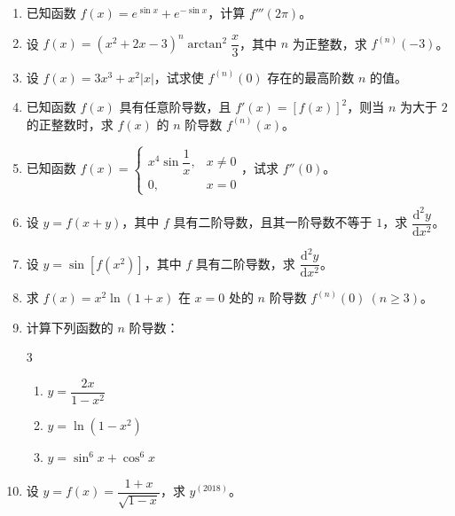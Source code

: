 \begin{enumerate}[label=\textbf{\arabic*.}, itemsep=5.2cm]
    \item 已知函数 $f(x) = e^{\sin x} + e^{-\sin x}$，计算 $f'''(2\pi)$。

    \item 设 $f(x) = (x^2 + 2x - 3)^n \arctan^2 \dfrac{x}{3}$，其中 $n$ 为正整数，求 $f^{(n)}(-3)$。

    \item 设 $f(x) = 3x^3 + x^2 |x|$，试求使 $f^{(n)}(0)$ 存在的最高阶数 $n$ 的值。

    \item 已知函数 $f(x)$ 具有任意阶导数，且 $f'(x) = [f(x)]^2$，则当 $n$ 为大于 $2$ 的正整数时，求 $f(x)$ 的 $n$ 阶导数 $f^{(n)}(x)$。

    \item 已知函数 $f(x) = \begin{cases} x^4 \sin \dfrac{1}{x}, & x \neq 0 \\ 0, & x = 0 \end{cases}$，试求 $f''(0)$。

    \item 设 $y = f(x+y)$，其中 $f$ 具有二阶导数，且其一阶导数不等于 $1$，求 $\dfrac{\mathrm{d}^2 y}{\mathrm{d} x^2}$。

    \item 设 $y = \sin [f(x^2)]$，其中 $f$ 具有二阶导数，求 $\dfrac{\mathrm{d}^2 y}{\mathrm{d} x^2}$。

    \item 求 $f(x) = x^2 \ln(1+x)$ 在 $x=0$ 处的 $n$ 阶导数 $f^{(n)}(0) \ (n \ge 3)$。

\vspace{2em}

    \item 计算下列函数的 $n$ 阶导数：
    \begin{multicols}{3}
        \begin{enumerate}[label=(\arabic*),itemsep=8cm]
            \item $y = \dfrac{2x}{1 - x^2}$
            \item $y = \ln(1 - x^2)$
            \item $y = \sin^6 x + \cos^6 x$
        \end{enumerate}
    \end{multicols}

\vspace{6em}

    \item 设 $y = f(x) = \dfrac{1+x}{\sqrt{1-x}}$，求 $y^{(2018)}$。


\end{enumerate}
